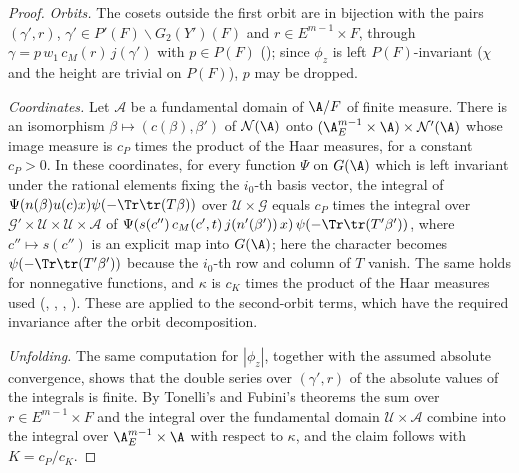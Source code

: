 \begin{proof}
\emph{Orbits.} The cosets outside the first orbit are in bijection with the pairs $(\gamma',r)$, $\gamma'\in P'(F)\backslash G_2(Y')(F)$
and $r\in E^{m-1}\times F$, through $\gamma=p\,w_1\,c_M(r)\,j(\gamma')$ with $p\in P(F)$
(); since $\phi_z$ is left
$P(F)$-invariant ($\chi$ and the height are trivial on $P(F)$), $p$ may be dropped.

\emph{Coordinates.} Let $\mathcal A$ be a fundamental domain of $\A/F$ of finite measure. There is an isomorphism
$\beta\mapsto(c(\beta),\beta')$ of $\mathcal N(\A)$ onto $(\tliftAE^{m-1}\times\A)\times\mathcal N'(\A)$ whose image measure is $c_P$ times the product
of the Haar measures, for a constant $c_P>0$. In these coordinates, for every function $\Psi$ on $G(\A)$ which is left
invariant under the rational elements fixing the $i_0$-th basis vector, the integral of
$\Psi(n(\beta)u(c)x)\psi(-\Tr\tr(T\beta))$ over $\mathcal U\times\mathcal G$ equals $c_P$ times the integral over
$\mathcal G'\times\mathcal U\times\mathcal U\times\mathcal A$ of $\Psi(s(c'')\,c_M(c',t)\,j(n'(\beta'))\,x)\,\psi(-\Tr\tr(T'\beta'))$, where $c''\mapsto s(c'')$ is an
explicit map into $G(\A)$; here the character becomes $\psi(-\Tr\tr(T'\beta'))$ because the $i_0$-th row and column of $T$
vanish. The same holds for nonnegative functions, and $\kappa$ is $c_K$ times the product of the Haar measures used
(,
,
,
). These are applied to the second-orbit terms, which
have the required invariance after the orbit decomposition.

\emph{Unfolding.} The same computation for $|\phi_z|$, together with the assumed absolute convergence, shows that the
double series over $(\gamma',r)$ of the absolute values of the integrals is finite. By Tonelli's and Fubini's theorems
the sum over $r\in E^{m-1}\times F$ and the integral over the fundamental domain $\mathcal U\times\mathcal A$ combine into the integral over
$\tliftAE^{m-1}\times\A$ with respect to $\kappa$, and the claim follows with $K=c_P/c_K$.
\end{proof}

